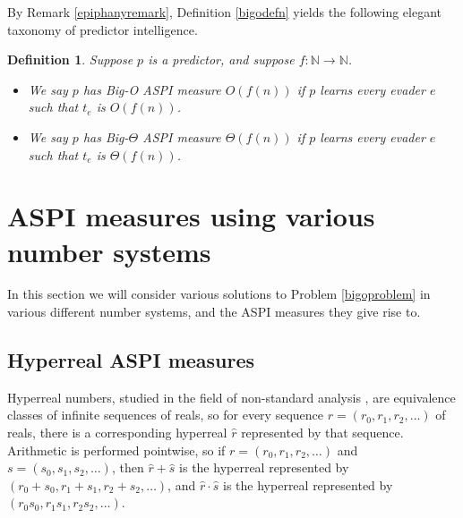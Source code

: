 \documentclass{article}
\newtheorem{definition}[theorem]{Definition}
\begin{document}
By Remark \ref{epiphanyremark}, Definition \ref{bigodefn} yields the following elegant
taxonomy of predictor intelligence.

\begin{definition}
\label{bigointelligencedefn}
    Suppose $p$ is a predictor, and suppose $f:\mathbb N\to\mathbb N$.
    \begin{itemize}
        \item
        We say \emph{$p$ has Big-O ASPI measure $O(f(n))$} if
        $p$ learns every evader $e$ such that $t_e$ is $O(f(n))$.
        \item
        We say \emph{$p$ has Big-$\Theta$ ASPI measure $\Theta(f(n))$} if
        $p$ learns every evader $e$ such that $t_e$ is $\Theta(f(n))$.
    \end{itemize}
\end{definition}

\section{ASPI measures using various number systems}
\label{exoticsection}

In this section we will consider various solutions to
Problem \ref{bigoproblem} in various different number systems,
and the ASPI measures they give rise to.

\subsection{Hyperreal ASPI measures}

Hyperreal numbers, studied in the field of non-standard analysis \cite{robinson}
\cite{goldblatt2012lectures},
are equivalence classes of infinite sequences of reals,
so for every sequence $r=(r_0,r_1,r_2,\ldots)$ of reals, there is a corresponding
hyperreal $\hat r$ represented by that sequence.
Arithmetic is performed pointwise, so if $r=(r_0,r_1,r_2,\ldots)$ and
$s=(s_0,s_1,s_2,\ldots)$, then $\hat r + \hat s$
is the hyperreal represented by $(r_0+s_0,r_1+s_1,r_2+s_2,\ldots)$,
and $\hat r\cdot\hat s$ is the hyperreal represented by
$(r_0 s_0,r_1 s_1, r_2 s_2,\ldots)$.
\end{document}
